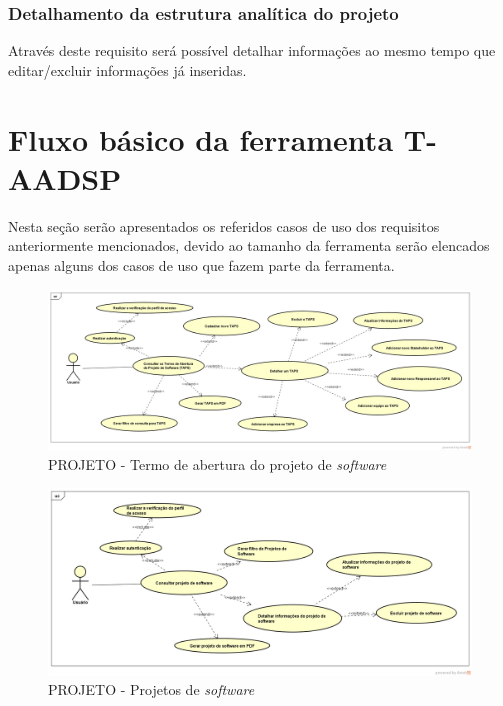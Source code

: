 \documentclass{acm_proc_article-sp}
\begin{document}
\subsubsection{Detalhamento da estrutura analítica do projeto}
Através deste requisito será possível detalhar informações ao mesmo tempo que editar/excluir informações já inseridas.

\section{Fluxo básico da ferramenta T-AADSP}
Nesta seção serão apresentados os referidos casos de uso dos requisitos anteriormente mencionados, devido ao tamanho da ferramenta serão elencados apenas alguns dos casos de uso que fazem parte da ferramenta.

\begin{figure}[h]
\centering %
\includegraphics[width=1\textwidth]{TAP.png} %
\caption{PROJETO - Termo de abertura do projeto de  \textit{software}}
\end{figure}

\begin{figure}[h]
\centering %
\includegraphics[width=1\textwidth]{Consulta_de_Projeto.png} %
\caption{PROJETO - Projetos de  \textit{software}}
\end{figure}
\end{document}
